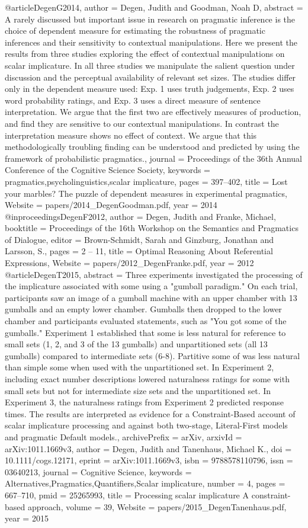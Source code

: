 @article{DegenG2014,
author = {Degen, Judith and Goodman, Noah D},
abstract = {A rarely discussed but important issue in research on pragmatic inference is the choice of dependent measure for estimating the robustness of pragmatic inferences and their sensitivity to contextual manipulations. Here we present the results from three studies exploring the effect of contextual manipulations on scalar implicature. In all three studies we manipulate the salient question under discussion and the perceptual availability of relevant set sizes. The studies differ only in the dependent measure used: Exp. 1 uses truth judgements, Exp. 2 uses word probability ratings, and Exp. 3 uses a direct measure of sentence interpretation. We argue that the first two are effectively measures of production, and find they are sensitive to our contextual manipulations. In contrast the interpretation measure shows no effect of context. We argue that this methodologically troubling finding can be understood and predicted by using the framework of probabilistic pragmatics.},
journal = {Proceedings of the 36th Annual Conference of the Cognitive Science Society},
keywords = {pragmatics,psycholinguistics,scalar implicature},
pages = {397--402},
title = {{Lost your marbles? The puzzle of dependent measures in experimental pragmatics}},
Website = {papers/2014_DegenGoodman.pdf},
year = {2014}
}
@inproceedings{DegenF2012,
author = {Degen, Judith and Franke, Michael},
booktitle = {Proceedings of the 16th Workshop on the Semantics and Pragmatics of Dialogue},
editor = {Brown-Schmidt, Sarah and Ginzburg, Jonathan and Larsson, S.},
pages = {2 -- 11},
title = {{Optimal Reasoning About Referential Expressions}},
Website = {papers/2012_DegenFranke.pdf},
year = {2012}
}
@article{DegenT2015,
abstract = {Three experiments investigated the processing of the implicature associated with some using a "gumball paradigm." On each trial, participants saw an image of a gumball machine with an upper chamber with 13 gumballs and an empty lower chamber. Gumballs then dropped to the lower chamber and participants evaluated statements, such as "You got some of the gumballs." Experiment 1 established that some is less natural for reference to small sets (1, 2, and 3 of the 13 gumballs) and unpartitioned sets (all 13 gumballs) compared to intermediate sets (6-8). Partitive some of was less natural than simple some when used with the unpartitioned set. In Experiment 2, including exact number descriptions lowered naturalness ratings for some with small sets but not for intermediate size sets and the unpartitioned set. In Experiment 3, the naturalness ratings from Experiment 2 predicted response times. The results are interpreted as evidence for a Constraint-Based account of scalar implicature processing and against both two-stage, Literal-First models and pragmatic Default models.},
archivePrefix = {arXiv},
arxivId = {arXiv:1011.1669v3},
author = {Degen, Judith and Tanenhaus, Michael K.},
doi = {10.1111/cogs.12171},
eprint = {arXiv:1011.1669v3},
isbn = {9788578110796},
issn = {03640213},
journal = {Cognitive Science},
keywords = {Alternatives,Pragmatics,Quantifiers,Scalar implicature},
number = {4},
pages = {667--710},
pmid = {25265993},
title = {{Processing scalar implicature A constraint-based approach}},
volume = {39},
Website = {papers/2015_DegenTanenhaus.pdf},
year = {2015}
}
